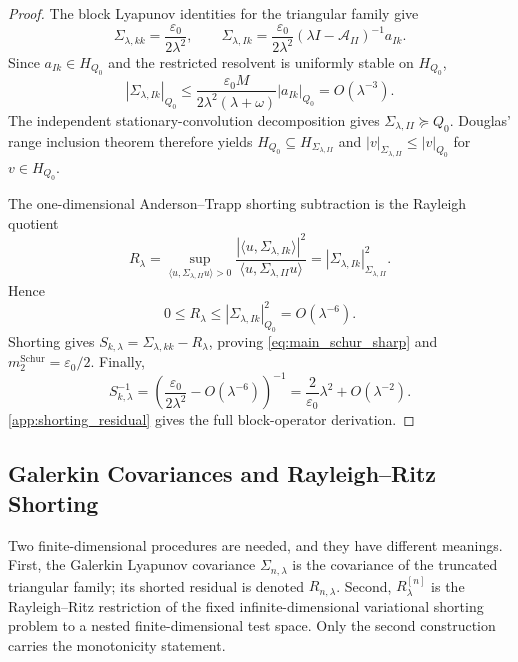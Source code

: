\documentclass[preprint,12pt]{elsarticle}
\theoremstyle{plain}
\theoremstyle{definition}
\theoremstyle{remark}
\begin{document}
    \begin{proof}
        The block Lyapunov identities for the triangular family give
        \[
            \Sigma_{\lambda,kk}=\frac{\varepsilon_0}{2\lambda^2},
            \qquad
            \Sigma_{\lambda,Ik}
            =
            \frac{\varepsilon_0}{2\lambda^2}
            (\lambda I-\mathcal{A}_{II})^{-1}a_{Ik}.
        \]
        Since $a_{Ik}\in H_{Q_0}$ and the restricted resolvent is uniformly
        stable on $H_{Q_0}$,
        \[
            |\Sigma_{\lambda,Ik}|_{Q_0}
            \le
            \frac{\varepsilon_0 M}{2\lambda^2(\lambda+\omega)}
            |a_{Ik}|_{Q_0}
            =
            O(\lambda^{-3}).
        \]
        The independent stationary-convolution decomposition gives
        $\Sigma_{\lambda,II}\succeq Q_0$.  Douglas' range inclusion theorem
        therefore yields $H_{Q_0}\subseteq H_{\Sigma_{\lambda,II}}$ and
        $|v|_{\Sigma_{\lambda,II}}\le |v|_{Q_0}$ for $v\in H_{Q_0}$.

        The one-dimensional Anderson--Trapp shorting subtraction is the
        Rayleigh quotient
        \[
            R_\lambda
            =
            \sup_{\langle u,\Sigma_{\lambda,II}u\rangle>0}
            \frac{|\langle u,\Sigma_{\lambda,Ik}\rangle|^2}
                 {\langle u,\Sigma_{\lambda,II}u\rangle}
            =
            |\Sigma_{\lambda,Ik}|_{\Sigma_{\lambda,II}}^2.
        \]
        Hence
        \[
            0\le R_\lambda
            \le |\Sigma_{\lambda,Ik}|_{Q_0}^2
            =
            O(\lambda^{-6}).
        \]
        Shorting gives
        $S_{k,\lambda}=\Sigma_{\lambda,kk}-R_\lambda$, proving
        \eqref{eq:main_schur_sharp} and
        $m_2^{\mathrm{Schur}}=\varepsilon_0/2$.  Finally,
        \[
            S_{k,\lambda}^{-1}
            =
            \left(\frac{\varepsilon_0}{2\lambda^2}-O(\lambda^{-6})\right)^{-1}
            =
            \frac{2}{\varepsilon_0}\lambda^2+O(\lambda^{-2}).
        \]
        \ref{app:shorting_residual} gives the full block-operator
        derivation.
    \end{proof}

    \subsection{Galerkin Covariances and Rayleigh--Ritz Shorting}
    \label{sec:proofs:convergence}

    Two finite-dimensional procedures are needed, and they have different
    meanings.  First, the Galerkin Lyapunov covariance
    $\Sigma_{n,\lambda}$ is the covariance of the truncated triangular family;
    its shorted residual is denoted $R_{n,\lambda}$.  Second,
    $R_\lambda^{[n]}$ is the Rayleigh--Ritz restriction of the fixed
    infinite-dimensional variational shorting problem to a nested
    finite-dimensional test space.  Only the second construction carries the
    monotonicity statement.
\end{document}

